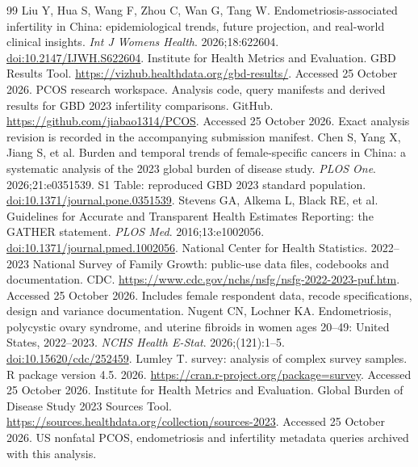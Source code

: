 \documentclass[11pt,a4paper]{article}
\begin{document}
{\begin{thebibliography}{99}
 Liu Y, Hua S, Wang F, Zhou C, Wan G, Tang W. Endometriosis-associated infertility in China: epidemiological trends, future projection, and real-world clinical insights. \emph{Int J Womens Health}. 2026;18:622604. \href{https://doi.org/10.2147/IJWH.S622604}{doi:10.2147/IJWH.S622604}.
 Institute for Health Metrics and Evaluation. GBD Results Tool. \url{https://vizhub.healthdata.org/gbd-results/}. Accessed 25 October 2026.
 PCOS research workspace. Analysis code, query manifests and derived results for GBD 2023 infertility comparisons. GitHub. \url{https://github.com/jiabao1314/PCOS}. Accessed 25 October 2026. Exact analysis revision is recorded in the accompanying submission manifest. Chen S, Yang X, Jiang S, et al. Burden and temporal trends of female-specific cancers in China: a systematic analysis of the 2023 global burden of disease study. \emph{PLOS One}. 2026;21:e0351539. S1 Table: reproduced GBD 2023 standard population. \href{https://doi.org/10.1371/journal.pone.0351539}{doi:10.1371/journal.pone.0351539}.
 Stevens GA, Alkema L, Black RE, et al. Guidelines for Accurate and Transparent Health Estimates Reporting: the GATHER statement. \emph{PLOS Med}. 2016;13:e1002056. \href{https://doi.org/10.1371/journal.pmed.1002056}{doi:10.1371/journal.pmed.1002056}.
 National Center for Health Statistics. 2022--2023 National Survey of Family Growth: public-use data files, codebooks and documentation. CDC. \url{https://www.cdc.gov/nchs/nsfg/nsfg-2022-2023-puf.htm}. Accessed 25 October 2026. Includes female respondent data, recode specifications, design and variance documentation.
 Nugent CN, Lochner KA. Endometriosis, polycystic ovary syndrome, and uterine fibroids in women ages 20--49: United States, 2022--2023. \emph{NCHS Health E-Stat}. 2026;(121):1--5. \href{https://doi.org/10.15620/cdc/252459}{doi:10.15620/cdc/252459}.
 Lumley T. survey: analysis of complex survey samples. R package version 4.5. 2026. \url{https://cran.r-project.org/package=survey}. Accessed 25 October 2026.
 Institute for Health Metrics and Evaluation. Global Burden of Disease Study 2023 Sources Tool. \url{https://sources.healthdata.org/collection/sources-2023}. Accessed 25 October 2026. US nonfatal PCOS, endometriosis and infertility metadata queries archived with this analysis.\end{thebibliography}
}
\end{document}
